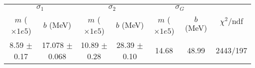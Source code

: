 \begin{tabular}{cc|cc|cc||c}
\multicolumn{2}{c|}{$\sigma_1$} & \multicolumn{2}{|c}{$\sigma_2$} & \multicolumn{2}{|c}{$\sigma_G$}  & \multirow{2}{*}{$\chi^2/$ndf}\\
$m$ ($\times1e5$) & $b$ (MeV) & $m$ ($\times1e5$) & $b$ (MeV) & $m$ ($\times1e5$) & $b$ (MeV) & \\
\hline
8.59 $\pm$ 0.17 & 17.078 $\pm$ 0.068 & 10.89 $\pm$ 0.28 & 28.39 $\pm$ 0.10 & 14.68 & 48.99 & 2443/197\\
\end{tabular}
